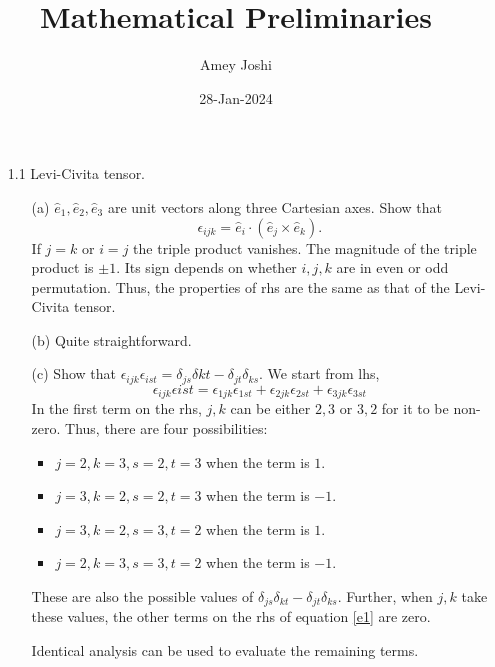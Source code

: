 \documentclass{article}
\title{Mathematical Preliminaries}\label{c1}
\author{Amey Joshi}
\date{28-Jan-2024}
\begin{document}
\maketitle
\begin{enumerate}
\item[1.1] Levi-Civita tensor.
\begin{enumerate}
\item[(a)] $\hat{e}_1, \hat{e}_2, \hat{e}_3$ are unit vectors along three 
Cartesian axes. Show that
\[
\epsilon_{ijk} = \hat{e}_i\cdot(\hat{e}_j \times \hat{e}_k).
\]
If $j = k$ or $i = j$ the triple product vanishes. The magnitude of the
triple product is $\pm 1$. Its sign depends on whether $i, j, k$ are in
even or odd permutation. Thus, the properties of rhs are the same as that of
the Levi-Civita tensor.

\item[(b)] Quite straightforward.

\item[(c)] Show that $\epsilon_{ijk}\epsilon_{ist} = \delta_{js}\delta{kt} 
- \delta_{jt}\delta_{ks}$.
We start from lhs,
\begin{equation}\label{e1}
\epsilon_{ijk}\epsilon{ist} = \epsilon_{1jk}\epsilon_{1st} +
                              \epsilon_{2jk}\epsilon_{2st} +
                              \epsilon_{3jk}\epsilon_{3st} 
\end{equation}
In the first term on the rhs, $j, k$ can be either $2, 3$ or $3, 2$ for it
to be non-zero. Thus, there are four possibilities:
\begin{itemize}
\item $j = 2, k = 3, s = 2, t = 3$ when the term is $1$.
\item $j = 3, k = 2, s = 2, t = 3$ when the term is $-1$.
\item $j = 3, k = 2, s = 3, t = 2$ when the term is $1$.
\item $j = 2, k = 3, s = 3, t = 2$ when the term is $-1$.
\end{itemize}
These are also the possible values of $\delta_{js}\delta_{kt} - \delta_{jt}
\delta_{ks}$. Further, when $j, k$ take these values, the other terms on
the rhs of equation \eqref{e1} are zero.

Identical analysis can be used to evaluate the remaining terms.


\end{enumerate}
\end{enumerate}
\end{document}
